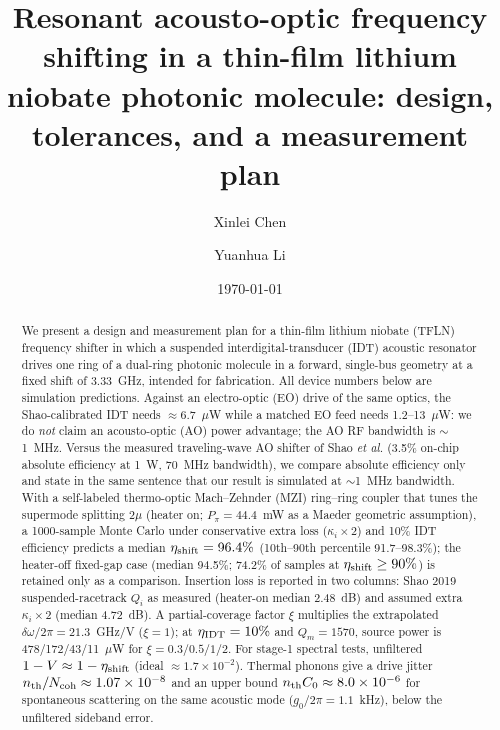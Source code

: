 \documentclass[aps,prapplied,reprint,superscriptaddress,amsmath,amssymb,floatfix]{revtex4-2}
\newcommand{\etash}{\eta_{\rm shift}}
\begin{document}
\title{Resonant acousto-optic frequency shifting in a thin-film lithium niobate photonic molecule: design, tolerances, and a measurement plan}

\author{Xinlei Chen}
\author{Yuanhua Li}

\date{\today}

\begin{abstract}
We present a design and measurement plan for a thin-film lithium niobate (TFLN) frequency shifter in which a suspended interdigital-transducer (IDT) acoustic resonator drives one ring of a dual-ring photonic molecule in a forward, single-bus geometry at a fixed shift of 3.33~GHz, intended for fabrication. All device numbers below are simulation predictions. Against an electro-optic (EO) drive of the same optics, the Shao-calibrated IDT needs $\approx$6.7~$\mu$W while a matched EO feed needs 1.2--13~$\mu$W: we do \emph{not} claim an acousto-optic (AO) power advantage; the AO RF bandwidth is $\sim$1~MHz. Versus the measured traveling-wave AO shifter of Shao \emph{et al.} (3.5\% on-chip absolute efficiency at 1~W, 70~MHz bandwidth), we compare absolute efficiency only and state in the same sentence that our result is simulated at $\sim$1~MHz bandwidth. With a self-labeled thermo-optic Mach--Zehnder (MZI) ring--ring coupler that tunes the supermode splitting $2\mu$ (heater on; $P_\pi=44.4$~mW as a Maeder geometric assumption), a 1000-sample Monte Carlo under conservative extra loss ($\kappa_i\times2$) and 10\% IDT efficiency predicts a median $\etash=96.4\%$ (10th--90th percentile 91.7--98.3\%); the heater-off fixed-gap case (median 94.5\%; 74.2\% of samples at $\etash\ge90\%$) is retained only as a comparison. Insertion loss is reported in two columns: Shao 2019 suspended-racetrack $Q_i$ as measured (heater-on median 2.48~dB) and assumed extra $\kappa_i\times2$ (median 4.72~dB). A partial-coverage factor $\xi$ multiplies the extrapolated $\delta\omega/2\pi=21.3$~GHz/V ($\xi=1$); at $\eta_{\rm IDT}=10\%$ and $Q_m=1570$, source power is 478/172/43/11~$\mu$W for $\xi=0.3/0.5/1/2$. For stage-1 spectral tests, unfiltered $1-V\approx1-\etash$ (ideal $\approx1.7\times10^{-2}$). Thermal phonons give a drive jitter $n_{\rm th}/N_{\rm coh}\approx1.07\times10^{-8}$ and an upper bound $n_{\rm th}C_0\approx8.0\times10^{-6}$ for spontaneous scattering on the same acoustic mode ($g_0/2\pi=1.1$~kHz), below the unfiltered sideband error.
\end{abstract}
\end{document}
